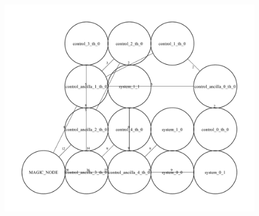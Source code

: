 \documentclass[a4paper,11pt]{ltjsarticle}
\begin{document}
{{        \begin{figure}[h]
            \centering
            \includegraphics[scale=0.40]{figure/final_state.pdf}
            \vspace{0pt}\caption{}
            \label{final_state}
            \vspace{-10pt}
        \end{figure}
    }
}
\end{document}
